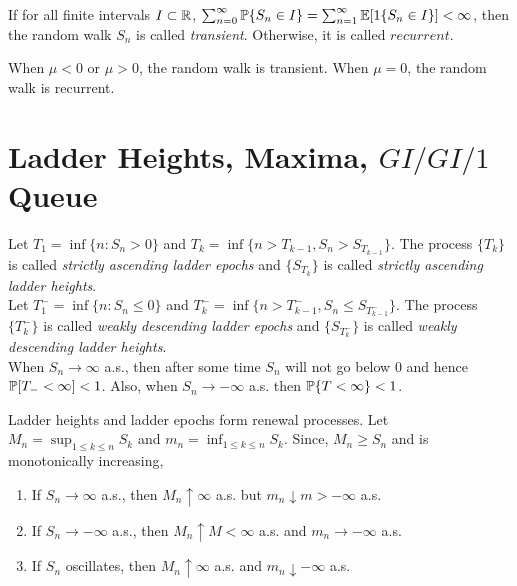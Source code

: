 \documentclass[all-lectures.tex]{subfiles}
\begin{document}
\begin{defn}
If for all finite intervals $I \subset \R$, $\sum_{n=0}^\infty \P\{S_n \in I\} = \sum_{n=1}^\infty \E[1\{S_n \in I\}] < \infty$, then the random walk $S_n$ is called \textit{transient}. Otherwise, it is called $recurrent$. 
\end{defn}
When $\mu < 0$ or $\mu > 0$, the random walk is transient. When $\mu =0$, the random walk is recurrent. \\
\section{Ladder Heights, Maxima, $GI/GI/1$ Queue}
\begin{defn}
Let $T_1 = \inf\{n:S_n > 0\}$ and $T_k = \inf\{n>T_{k-1}, S_n>{S_{T_{k-1}}}\}$. The process $\{T_k\}$ is called \textit{strictly ascending ladder epochs} and $\{S_{T_k}\}$ is called \textit{strictly ascending ladder heights}. \\
\indent Let ${T}_{1}^- = \inf\{n:S_n \leq 0\}$ and ${T}_{k}^- = \inf\{n>{T}_{k-1}^-, S_n \leq {S_{{T}_{k-1}^-}}\}$. The process $\{{T}_{k}^-\}$ is called \textit{weakly descending ladder epochs} and $\{S_{{T}_{k}^-}\}$ is called \textit{weakly descending ladder heights}. \\
\indent When $S_n \to \infty$ a.s., then after some time $S_n$ will not go below $0$ and hence $\P[T_- < \infty] < 1$. Also, when $S_n \to -\infty$ a.s. then $\P\{T<\infty\} < 1$.
\end{defn}

Ladder heights and ladder epochs form renewal processes. Let $M_n = \sup_{1\leq k \leq n} S_k$ and $m_n = \inf_{1\leq k \leq n} S_k$. Since, $M_n \geq S_n$ and is monotonically increasing, 
\begin{enumerate}
\item If $S_n \to \infty$  a.s., then $M_n \uparrow \infty$ a.s. but $m_n \downarrow m > -\infty$ a.s.
\item If $S_n \to -\infty$ a.s., then $M_n \uparrow M < \infty$ a.s. and $m_n \to -\infty$ a.s.
\item If $S_n$ oscillates, then $M_n \uparrow \infty$ a.s. and $m_n \downarrow -\infty$ a.s.
\end{enumerate}
\end{document}

